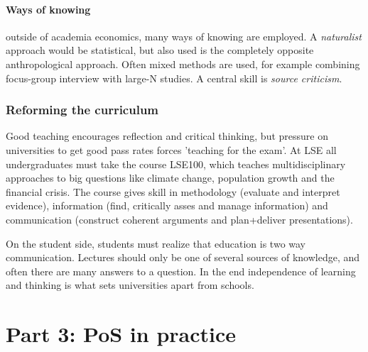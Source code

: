 \documentclass[12pt, a4paper]{article}
\begin{document}
\begin{multicols}{2}
\paragraph{Ways of knowing} outside of academia economics, many ways of knowing are employed. A \textit{naturalist} approach would be statistical, but also used is the completely opposite anthropological approach. Often mixed methods are used, for example combining focus-group interview with large-N studies. A central skill is \textit{source criticism}.

\subsubsection{Reforming the curriculum}

Good teaching encourages reflection and critical thinking, but pressure on universities to get good pass rates forces 'teaching for the exam'. At LSE all undergraduates must take the course LSE100, which teaches multidisciplinary approaches to big questions like climate change, population growth and the financial crisis. The course gives skill in methodology (evaluate and interpret evidence), information (find, critically asses and manage information) and communication (construct coherent arguments and plan+deliver presentations).

On the student side, students must realize that education is two way communication. Lectures should only be one of several sources of knowledge, and often there are many answers to a question. In the end independence of learning and thinking is what sets universities apart from schools. 

\section{Part 3: PoS in practice}

\end{multicols}
\end{document}
